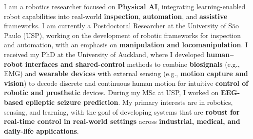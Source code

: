 

\begin{cvparagraph}



I am a robotics researcher focused on \textbf{Physical AI}, integrating learning-enabled robot capabilities into real-world \textbf{inspection}, \textbf{automation}, and \textbf{assistive} frameworks. I am currently a Postdoctoral Researcher at the University of São Paulo (USP), working on the development of robotic frameworks for inspection and automation, with an emphasis on \textbf{manipulation and locomanipulation}. I received my PhD at the University of Auckland, where I developed \textbf{human–robot interfaces and shared-control} methods to combine \textbf{biosignals} (e.g., EMG) and \textbf{wearable devices} with external sensing (e.g., \textbf{motion capture and vision}) to decode discrete and continuous human motion for intuitive \textbf{control of robotic and prosthetic} devices. During my MSc at USP, I worked on \textbf{EEG-based epileptic seizure prediction}. My primary interests are in robotics, sensing, and learning, with the goal of developing systems that are \textbf{robust for real-time control in real-world settings} across \textbf{industrial, medical, and daily-life applications}.

\end{cvparagraph}
